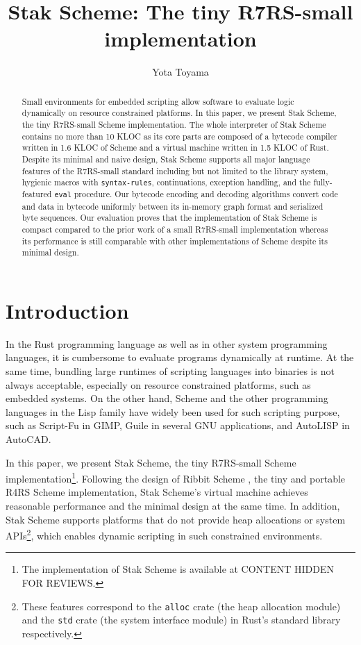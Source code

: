 \documentclass[sigplan]{acmart}
\newcommand{\draft}[1]{CONTENT HIDDEN FOR REVIEWS}
\newcommand{\draft}[1]{#1}
\begin{document}
\title{Stak Scheme: The tiny R7RS-small implementation}
\author{Yota Toyama}

\begin{abstract}
  Small environments for embedded scripting allow software to
  evaluate logic dynamically on resource constrained platforms.
  In this paper, we present Stak Scheme, the tiny R7RS-small
  Scheme implementation.
  The whole interpreter of Stak Scheme contains no more than 10 KLOC as
  its core parts are composed of a bytecode compiler written in 1.6 KLOC
  of Scheme and a virtual machine written in 1.5 KLOC of Rust.
  Despite its minimal and naive design, Stak Scheme
  supports all major language features of the R7RS-small standard including
  but not limited to the library system, hygienic macros with
  \texttt{syntax-rules}, continuations, exception handling, and the
  fully-featured \texttt{eval} procedure.
  Our bytecode encoding and decoding algorithms convert code and
  data in bytecode uniformly
  between its in-memory graph format and serialized byte sequences.
  Our evaluation proves that the implementation of Stak Scheme is
  compact compared to the prior work of a small R7RS-small implementation
  whereas its performance is still comparable with other
  implementations of Scheme despite its minimal design.
\end{abstract}

\maketitle

\pagestyle{empty}

\section{Introduction}

In the Rust programming language as well as in other system
programming languages, it is cumbersome to evaluate programs
dynamically at runtime. At the same time, bundling large runtimes of
scripting languages into binaries is not always acceptable,
especially on resource constrained platforms, such as embedded systems.
On the other hand, Scheme and the other programming languages in the
Lisp family have widely
been used for such scripting purpose, such as Script-Fu \cite{scriptfu}
in GIMP, Guile \cite{guile} in several GNU applications, and
AutoLISP \cite{autolisp} in AutoCAD.

In this paper, we present Stak Scheme, the tiny R7RS-small Scheme
implementation\footnote{
  The implementation of Stak Scheme is available at
  \draft{\url{https://github.com/raviqqe/stak}}.
}.
Following the design of Ribbit Scheme
\cite{ribbit2023}, the tiny and
portable R4RS Scheme implementation, Stak Scheme's virtual machine
achieves reasonable performance and the minimal design
at the same time.
In addition, Stak Scheme supports platforms that do not provide
heap allocations or system APIs\footnote{
  These features correspond to the \texttt{alloc}
  crate (the heap allocation module) and the \texttt{std} crate (the
  system interface module) in Rust's standard library respectively.
}, which enables dynamic scripting in such constrained environments.
\end{document}
